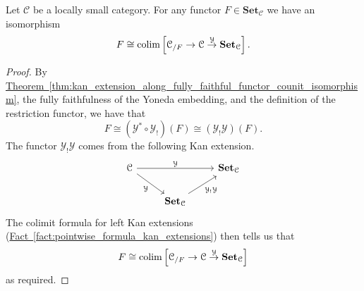 \documentclass[main.tex]{subfiles}
\begin{document}
\begin{lemma}
  \label{lemma:colimit_of_comma_category}
  Let $\mathcal{C}$ be a locally small category. For any functor $F\in \mathbf{Set}_{\mathcal{C}}$ we have an isomorphism
  \begin{equation*}
    F \cong \operatorname*{colim} \left[ \mathcal{C}_{/F} \to \mathcal{C} \overset{\mathcal{Y}}{\to} \mathbf{Set}_{\mathcal{C}} \right].
  \end{equation*}
\end{lemma}
\begin{proof}
  By \hyperref[thm:kan_extension_along_fully_faithful_functor_counit_isomorphism]{Theorem~\ref*{thm:kan_extension_along_fully_faithful_functor_counit_isomorphism}}, the fully faithfulness of the Yoneda embedding, and the definition of the restriction functor, we have that
  \begin{equation*}
    F \cong (\mathcal{Y}^{*} \circ \mathcal{Y}_{!})(F) \cong (\mathcal{Y}_{!}\mathcal{Y})(F).
  \end{equation*}
  The functor $\mathcal{Y}_{!}\mathcal{Y}$ comes from the following Kan extension.
  \begin{equation*}
    \begin{tikzcd}
      \mathcal{C}
      \arrow[rr, "\mathcal{Y}"]
      \arrow[dr, swap, "\mathcal{Y}"]
      && \mathbf{Set}_{\mathcal{C}}
      \\
      & \mathbf{Set}_{\mathcal{C}}
      \arrow[ur, swap, "\mathcal{Y}_{!} \mathcal{Y}"]
    \end{tikzcd}
  \end{equation*}
  The colimit formula for left Kan extensions (\hyperref[fact:pointwise_formula_kan_extensions]{Fact~\ref*{fact:pointwise_formula_kan_extensions}}) then tells us that
  \begin{equation*}
    F \cong \operatorname*{colim} \left[ \mathcal{C}_{/F} \to \mathcal{C} \overset{\mathcal{Y}}{\to} \mathbf{Set}_{\mathcal{C}} \right]
  \end{equation*}
  as required.

\end{proof}
\end{document}
